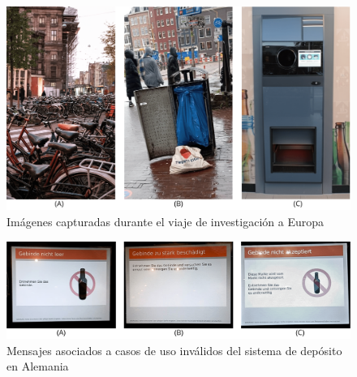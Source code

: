 \begin{figure}[!htb]
	\centering
	\includegraphics[width=\linewidth]{Figures/europe-pictures.png}
	\caption{Imágenes capturadas durante el viaje de investigación a Europa}
	\label{fig:europe-pictures}
\end{figure}

\begin{figure}[!htb]
	\centering
	\includegraphics[width=\linewidth]{Figures/europe-pfand-cases.png}
	\caption{Mensajes asociados a casos de uso inválidos del sistema de depósito en Alemania}
	\label{fig:europe-pfand-cases}
\end{figure}
